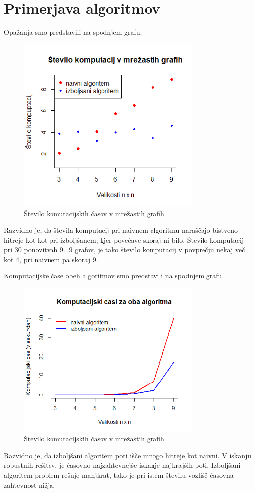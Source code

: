 \documentclass[a4paper, 12 pt]{article}
\theoremstyle{definition} %
\theoremstyle{plain} %
\theoremstyle{definition}
\begin{document}
\section{Primerjava algoritmov}

Opažanja smo predstavili na spodnjem grafu. 

\begin{figure}[H]
  \centering
  \includegraphics[width=90mm]{Rplot2.png}
  \caption{Število komutacijskih časov v mrežastih grafih}
  \label{fig: Graf 1}
\end{figure}

Razvidno je, da števila komputacij pri naivnem algoritmu naraščajo bistveno hitreje kot kot pri izboljšanem, kjer povečave skoraj ni bilo. Število komputacij pri 30 ponovitvah $9 \dots 9$ grafov, je tako število komputacij v povprečju nekaj več kot 4, pri naivnem pa skoraj 9.\newline

Komputacijske čase obeh algoritmov smo predstavili na spodnjem grafu.

\begin{figure}[H]
  \centering
  \includegraphics[width=90mm]{Rplot3.png}
  \caption{Število komutacijskih časov v mrežastih grafih}
  \label{fig: Graf 1}
\end{figure}


Razvidno je, da izboljšani algoritem poti išče mnogo hitreje kot naivni. V iskanju robustnih rešitev, je časovno najzahtevnejše iskanje najkrajših poti. Izboljšani algoritem problem rešuje manjkrat, tako je pri istem številu vozlišč časovna zahtevnost nižja.
\end{document}
